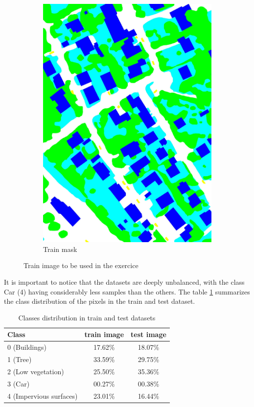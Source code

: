 \documentclass[10pt, a4paper]{article}
\begin{document}
\begin{figure}[htpb]
\begin{subfigure}[b]{0.32\textwidth}
      \includegraphics[width=\textwidth]{images/Reference_Train.pdf}
      \caption{Train mask}
      \label{fig:example_test}
  \end{subfigure}
  \caption{Train image to be used in the exercice}
  \label{fig:example}
\end{figure}

It is important to notice that the datasets are deeply unbalanced, with the class Car (4) having considerably less samples than the others. The table 
\ref{tab:class_distrib} summarizes the class distribution of the pixels in the train and test dataset.

\begin{table}[htpb]
  \centering
  \begin{tabular}{l|c|c|}
    Class                   &	train image	  & test image \\
    \hline
    0 (Buildings)           & 17.62\%       & 18.07\%    \\
    1 (Tree)                & 33.59\%       & 29.75\%    \\
    2 (Low vegetation)      & 25.50\%       & 35.36\%    \\
    3 (Car)                 & 00.27\%       & 00.38\%    \\
    4 (Impervious surfaces) & 23.01\%       & 16.44\%    \\
    \hline
  \end{tabular}
  \caption{Classes distribution in train and test datasets}
  \label{tab:class_distrib}
\end{table}
\end{document}
